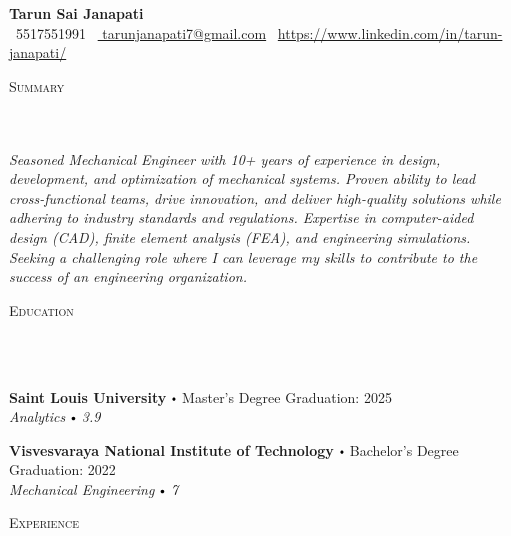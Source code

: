 \documentclass{article}
\newcommand{\school}[4]{
        \textbf{#1} \labelitemi #2 \hfill #3 \\ #4 \vspace*{5pt}
      }
\newcommand{\lineunder}{
        \vspace*{-8pt} \\ \hspace*{-18pt} 
        \hrulefill \\
        }
\newcommand{\header}[1]{{
        \hspace*{-15pt}\vspace*{6pt} \textsc{#1}} \vspace*{-6pt} 
        \lineunder
        }
\renewcommand{\labelitemi}{
        $\vcenter{\hbox{\tiny$\bullet$}}$\hspace*{3pt}
        }
\begin{document}
  
      \small
      \smallskip
      \vspace*{-44pt}
  
      \begin{center}
        {\LARGE \textbf{Tarun Sai Janapati}} \\
        \faPhone\ 5517551991 \quad
        \faEnvelope\ \href{mailto:  tarunjanapati7@gmail.com}{  tarunjanapati7@gmail.com} \quad
        \faLinkedin\ \url{https://www.linkedin.com/in/tarun-janapati/}
      \end{center}
     \vspace*{4pt}%
      \header{Summary}
  
      {
        \textit{ Seasoned Mechanical Engineer with 10+ years of experience in design, development, and optimization of mechanical systems. Proven ability to lead cross-functional teams, drive innovation, and deliver high-quality solutions while adhering to industry standards and regulations. Expertise in computer-aided design (CAD), finite element analysis (FEA), and engineering simulations. Seeking a challenging role where I can leverage my skills to contribute to the success of an engineering organization.}
        }
  
      \vspace{15pt}
  
     \header{Education}
  
      {
        \school{Saint Louis University}{Master's Degree}{Graduation: 2025}{\textit{Analytics \labelitemi 3.9}}
        

        \school{Visvesvaraya National Institute of Technology}{Bachelor's Degree}{Graduation: 2022}{\textit{Mechanical Engineering \labelitemi 7}}
        }
  
      \vspace*{4pt}%
      \header{Experience}
  
\end{document}
